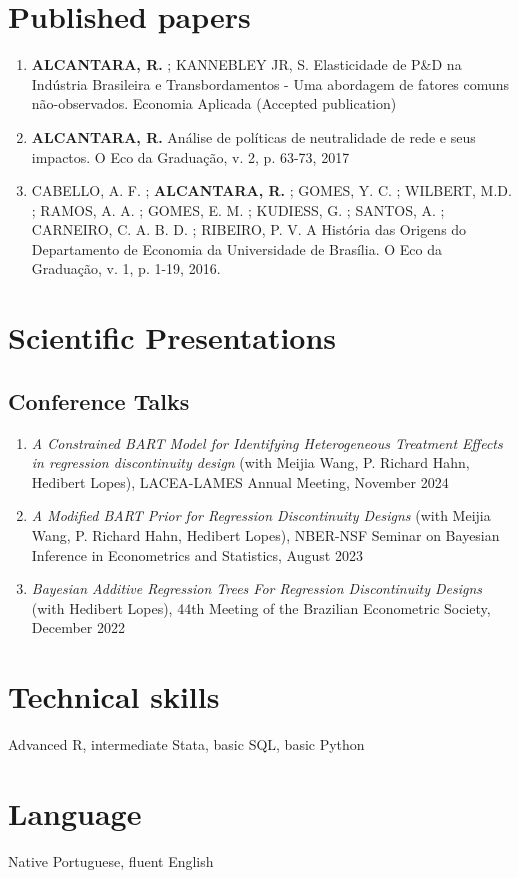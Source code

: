 \documentclass[10pt]{article}
\begin{document}
\section*{Published papers}
\label{sec:org9ffe268}
\begin{enumerate}
\item \textbf{ALCANTARA, R.} ; KANNEBLEY JR, S. Elasticidade de P\&D na Indústria Brasileira e Transbordamentos - Uma abordagem de fatores comuns não­-observados. Economia Aplicada (Accepted publication)
\item \textbf{ALCANTARA, R.} Análise de políticas de neutralidade de rede e seus impactos. O Eco da Graduação, v. 2, p. 63-73, 2017
\item CABELLO, A. F. ; \textbf{ALCANTARA, R.} ; GOMES, Y. C. ; WILBERT,
M.D. ; RAMOS, A. A. ; GOMES, E. M. ; KUDIESS, G. ; SANTOS, A. ;
CARNEIRO, C. A. B. D. ; RIBEIRO, P. V. A História das Origens do
Departamento de Economia da Universidade de Brasília. O Eco da
Graduação, v. 1, p. 1-19, 2016.
\end{enumerate}
\section*{Scientific Presentations}
\label{sec:org6763439}
\subsection*{Conference Talks}
\label{sec:org2e95ca5}
\begin{enumerate}
	\item \emph{A Constrained BART Model for Identifying Heterogeneous Treatment Effects in regression discontinuity design} (with Meijia Wang, P. Richard Hahn, Hedibert Lopes), LACEA-LAMES Annual Meeting, November 2024
	
	\item \emph{A Modified BART Prior for Regression Discontinuity Designs} (with Meijia Wang, P. Richard Hahn, Hedibert Lopes), NBER-NSF Seminar on Bayesian Inference in Econometrics and Statistics, August 2023
	
	\item \emph{Bayesian Additive Regression Trees For Regression Discontinuity Designs} (with Hedibert Lopes), 44th Meeting of the Brazilian Econometric Society, December 2022
\end{enumerate}
\section*{Technical skills}
\label{sec:orgc51371c}
Advanced R, intermediate Stata, basic SQL, basic Python
\section*{Language}
\label{sec:orgf2accdc}
Native Portuguese, fluent English
\end{document}
